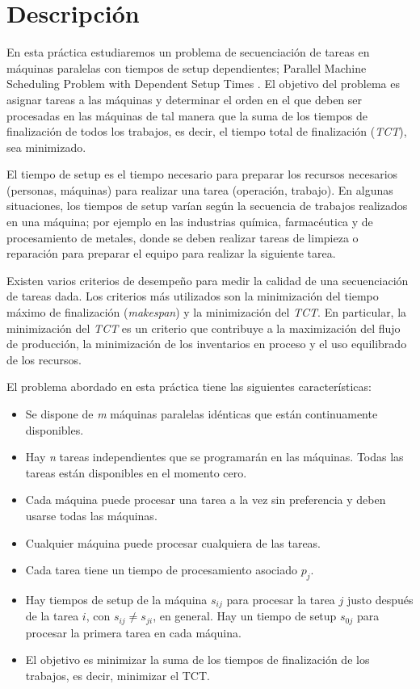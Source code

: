 \section{Descripción}\label{Problem_PMP}

En esta pr\'actica estudiaremos un problema de secuenciaci\'on de tareas en m\'aquinas paralelas con tiempos de setup dependientes; Parallel Machine Scheduling Problem
with Dependent Setup Times \cite{Baez2019}. El objetivo del problema es asignar tareas a las m\'aquinas y determinar el orden en el que deben ser procesadas en las m\'aquinas de tal manera que la suma de los tiempos de finalizaci\'on de todos los trabajos, es decir, el tiempo total de finalizaci\'on (\textit{TCT}), sea minimizado.

El tiempo de setup es el tiempo necesario para preparar los recursos necesarios (personas, m\'aquinas) para realizar una tarea (operaci\'on, trabajo). En algunas situaciones, los tiempos de setup var\'ian seg\'un la secuencia de trabajos realizados en una m\'aquina; por ejemplo en las industrias qu\'imica, farmac\'eutica y de procesamiento de metales, donde se deben realizar tareas de limpieza o reparaci\'on para preparar el equipo para realizar la siguiente tarea.

Existen varios criterios de desempe\~no para medir la calidad de una secuenciaci\'on de tareas dada. Los criterios m\'as utilizados son la minimizaci\'on del tiempo m\'aximo de finalizaci\'on (\textit{makespan}) y la minimizaci\'on del \textit{TCT}. En particular, la minimizaci\'on del \textit{TCT} es un criterio que contribuye a la maximizaci\'on del flujo de producci\'on, la minimizaci\'on de los inventarios en proceso y el uso equilibrado de los recursos.

El problema abordado en esta pr\'actica tiene las siguientes caracter\'isticas:
\begin{itemize}
	\item Se dispone de \textit{m} m\'aquinas paralelas id\'enticas que est\'an continuamente disponibles.
  \item Hay \textit{n} tareas independientes que se programar\'an en las m\'aquinas. Todas las tareas est\'an disponibles en el momento cero.
  \item Cada m\'aquina puede procesar una tarea a la vez sin preferencia y deben usarse todas las m\'aquinas.
	\item Cualquier m\'aquina puede procesar cualquiera de las tareas.
	\item Cada tarea tiene un tiempo de procesamiento asociado $p_j$.
	\item Hay tiempos de setup de la m\'aquina $s_{ij}$ para procesar la tarea $j$ justo despu\'es de la tarea $i$, con $s_{ij} \neq s_{ji}$, en general. Hay un tiempo de setup $s_{0j}$ para procesar la primera tarea en cada m\'aquina.
  \item El objetivo es minimizar la suma de los tiempos de finalizaci\'on de los trabajos, es decir, minimizar el TCT.
\end{itemize}

